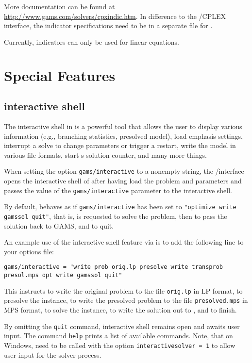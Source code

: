 More documentation can be found at \url{http://www.gams.com/solvers/cpxindic.htm}.
In difference to the \GAMS/CPLEX interface, the indicator specifications need to be in a separate file for \SCIP.

Currently, indicators can only be used for linear equations.

\section{Special Features}

\subsection{\SCIP interactive shell}

The interactive shell in \SCIP is a powerful tool that allows the user to display various information (e.g., branching statistics, presolved model), load emphasis settings, interrupt a solve to change parameters or trigger a restart, write the model in various file formats, start {\SCIP}s solution counter, and many more things.

When setting the option \texttt{gams/interactive} to a nonempty string, the \GAMS/\SCIP interface opens the interactive shell of \SCIP after having load the \GAMS problem and parameters and passes the value of the \texttt{gams/interactive} parameter to the \SCIP interactive shell.

By default, \SCIP behaves as if \texttt{gams/interactive} has been set to \texttt{"optimize write gamssol quit"}, that is, \SCIP is requested to solve the problem, then to pass the solution back to GAMS, and to quit.

An example use of the \SCIP interactive shell feature via \GAMS is to add the following line to your \SCIP options file:
\begin{verbatim}
gams/interactive = "write prob orig.lp presolve write transprob presol.mps opt write gamssol quit"
\end{verbatim}
This instructs \SCIP to write the original problem to the file \texttt{orig.lp} in LP format, to presolve the instance, to write the presolved problem to the file \texttt{presolved.mps} in MPS format, to solve the instance, to write the solution out to \GAMS, and to finish.

By omitting the \texttt{quit} command,  interactive shell remains open and awaits user input.
The command \texttt{help} prints a list of available commands.
Note, that on Windows, \GAMS need to be called with the option \texttt{interactivesolver = 1} to allow user input for the solver process.

